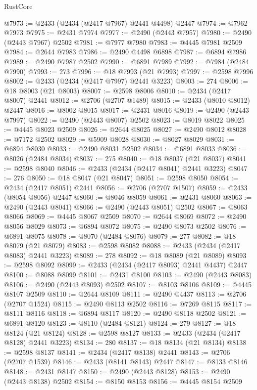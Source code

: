 \begin{lexlean}{RustCore}
\begin{coremodule}
@7973 := @2433 (@2434 (@2417 @7967) @2441 @4498) @2447
@7974 := @7962 @7973
@7975 := @2431 @7974
@7977 := @2490 (@2443 @7957)
@7980 := @2490 (@2443 @7967) @2502
@7981 := @7977 @7980
@7983 := @4445 @7981 @2509
@7984 := @2644 @7983
@7986 := @2490 @4498 @6898
@7987 := @6894 @7986
@7989 := @2490 @7987 @2502
@7990 := @6891 @7989
@7992 := @7984 (@2484 @7990)
@7993 := 273
@7996 := @18 @7993 (@21 @7993)
@7997 := @2598 @7996
@8002 := @2433 (@2434 (@2417 @7997) @2441 @3223)
@8003 := 274
@8006 := @18 @8003 (@21 @8003)
@8007 := @2598 @8006
@8010 := @2434 (@2417 @8007) @2441
@8012 := @2706 (@2707 @1489)
@8015 := @2433 (@8010 @8012) @2447
@8016 := @8002 @8015
@8017 := @2431 @8016
@8019 := @2490 (@2443 @7997)
@8022 := @2490 (@2443 @8007) @2502
@8023 := @8019 @8022
@8025 := @4445 @8023 @2509
@8026 := @2644 @8025
@8027 := @2490 @8012
@8028 := @7172 @2502
@8029 := @5909 @8028
@8030 := @8027 @8029
@8031 := @6894 @8030
@8033 := @2490 @8031 @2502
@8034 := @6891 @8033
@8036 := @8026 (@2484 @8034)
@8037 := 275
@8040 := @18 @8037 (@21 @8037)
@8041 := @2598 @8040
@8046 := @2433 (@2434 (@2417 @8041) @2441 @3223)
@8047 := 276
@8050 := @18 @8047 (@21 @8047)
@8051 := @2598 @8050
@8054 := @2434 (@2417 @8051) @2441
@8056 := @2706 (@2707 @1507)
@8059 := @2433 (@8054 @8056) @2447
@8060 := @8046 @8059
@8061 := @2431 @8060
@8063 := @2490 (@2443 @8041)
@8066 := @2490 (@2443 @8051) @2502
@8067 := @8063 @8066
@8069 := @4445 @8067 @2509
@8070 := @2644 @8069
@8072 := @2490 @8056 @8029
@8073 := @6894 @8072
@8075 := @2490 @8073 @2502
@8076 := @6891 @8075
@8078 := @8070 (@2484 @8076)
@8079 := 277
@8082 := @18 @8079 (@21 @8079)
@8083 := @2598 @8082
@8088 := @2433 (@2434 (@2417 @8083) @2441 @3223)
@8089 := 278
@8092 := @18 @8089 (@21 @8089)
@8093 := @2598 @8092
@8099 := @2433 (@2434 (@2417 @8093) @2441 @4437) @2447
@8100 := @8088 @8099
@8101 := @2431 @8100
@8103 := @2490 (@2443 @8083)
@8106 := @2490 (@2443 @8093) @2502
@8107 := @8103 @8106
@8109 := @4445 @8107 @2509
@8110 := @2644 @8109
@8111 := @2490 @4437
@8113 := @2706 (@2707 @1524)
@8115 := @2490 @8113 @2502
@8116 := @7269 @8115
@8117 := @8111 @8116
@8118 := @6894 @8117
@8120 := @2490 @8118 @2502
@8121 := @6891 @8120
@8123 := @8110 (@2484 @8121)
@8124 := 279
@8127 := @18 @8124 (@21 @8124)
@8128 := @2598 @8127
@8133 := @2433 (@2434 (@2417 @8128) @2441 @3223)
@8134 := 280
@8137 := @18 @8134 (@21 @8134)
@8138 := @2598 @8137
@8141 := @2434 (@2417 @8138) @2441
@8143 := @2706 (@2707 @1539)
@8146 := @2433 (@8141 @8143) @2447
@8147 := @8133 @8146
@8148 := @2431 @8147
@8150 := @2490 (@2443 @8128)
@8153 := @2490 (@2443 @8138) @2502
@8154 := @8150 @8153
@8156 := @4445 @8154 @2509

\end{coremodule}
\end{lexlean}
